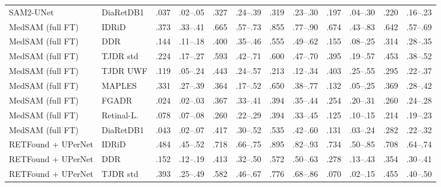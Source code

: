 \begin{landscape}
{\begin{longtable}{l l c c c c c c c c c c}
SAM2-UNet & DiaRetDB1 & .037 & \scriptsize .02--.05 & .327 & \scriptsize .24--.39 & .319 & \scriptsize .23--.30 & .197 & \scriptsize .04--.30 & .220 & \scriptsize .16--.23 \\
MedSAM (full FT) & IDRiD & .373 & \scriptsize .33--.41 & .665 & \scriptsize .57--.73 & .855 & \scriptsize .77--.90 & .674 & \scriptsize .43--.83 & .642 & \scriptsize .57--.69 \\
MedSAM (full FT) & DDR & .144 & \scriptsize .11--.18 & .400 & \scriptsize .35--.46 & .555 & \scriptsize .49--.62 & .155 & \scriptsize .08--.25 & .314 & \scriptsize .28--.35 \\
MedSAM (full FT) & TJDR std & .224 & \scriptsize .17--.27 & .593 & \scriptsize .42--.71 & .600 & \scriptsize .47--.70 & .395 & \scriptsize .19--.57 & .453 & \scriptsize .38--.52 \\
MedSAM (full FT) & TJDR UWF & .119 & \scriptsize .05--.24 & .443 & \scriptsize .24--.57 & .213 & \scriptsize .12--.34 & .403 & \scriptsize .25--.55 & .295 & \scriptsize .22--.37 \\
MedSAM (full FT) & MAPLES & .331 & \scriptsize .27--.39 & .364 & \scriptsize .17--.52 & .650 & \scriptsize .38--.77 & .132 & \scriptsize .05--.25 & .369 & \scriptsize .28--.42 \\
MedSAM (full FT) & FGADR & .024 & \scriptsize .02--.03 & .367 & \scriptsize .33--.41 & .394 & \scriptsize .35--.44 & .254 & \scriptsize .20--.31 & .260 & \scriptsize .24--.28 \\
MedSAM (full FT) & Retinal-L. & .078 & \scriptsize .07--.08 & .260 & \scriptsize .22--.29 & .394 & \scriptsize .33--.45 & .125 & \scriptsize .10--.15 & .214 & \scriptsize .19--.23 \\
MedSAM (full FT) & DiaRetDB1 & .043 & \scriptsize .02--.07 & .417 & \scriptsize .30--.52 & .535 & \scriptsize .42--.60 & .131 & \scriptsize .03--.24 & .282 & \scriptsize .22--.32 \\
RETFound + UPerNet & IDRiD & .484 & \scriptsize .45--.52 & .718 & \scriptsize .66--.75 & .895 & \scriptsize .82--.93 & .734 & \scriptsize .50--.85 & .708 & \scriptsize .64--.74 \\
RETFound + UPerNet & DDR & .152 & \scriptsize .12--.19 & .413 & \scriptsize .32--.50 & .572 & \scriptsize .50--.63 & .278 & \scriptsize .13--.43 & .354 & \scriptsize .30--.41 \\
RETFound + UPerNet & TJDR std & .393 & \scriptsize .25--.49 & .582 & \scriptsize .46--.67 & .776 & \scriptsize .68--.86 & .070 & \scriptsize .02--.15 & .455 & \scriptsize .40--.50 \\

\end{longtable}}
\end{landscape}
